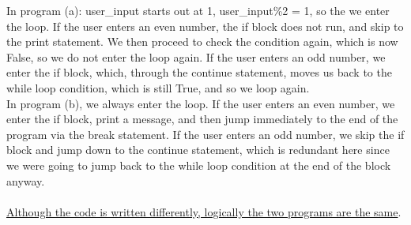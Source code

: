 \documentclass{article}
\begin{document}
\begin{enumerate}
{	In program (a): user\_input starts out at 1, user\_input\%2 = 1, so the we enter the loop. If the user enters an even number, the if block does not run, and skip to the print statement. We then proceed to check the condition again, which is now False, so we do not enter the loop again. If the user enters an odd number, we enter the if block, which, through the continue statement, moves us back to the while loop condition, which is still True, and so we loop again.\\ In program (b), we always enter the loop. If the user enters an even number, we enter the if block, print a message, and then jump immediately to the end of the program via the break statement. If the user enters an odd number, we skip the if block and jump down to the continue statement, which is redundant here since we were going to jump back to the while loop condition at the end of the block anyway.\\ \\ \underline{Although the code is written differently, logically the two programs are the same}.}
\end{enumerate}
\end{document}
